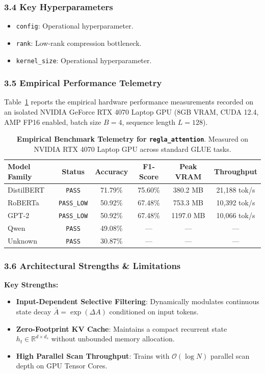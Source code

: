 \subsubsection*{3.4 Key Hyperparameters}
\begin{itemize}
    \item \texttt{config}: Operational hyperparameter.
    \item \texttt{rank}: Low-rank compression bottleneck.
    \item \texttt{kernel\_size}: Operational hyperparameter.
\end{itemize}

\subsubsection*{3.5 Empirical Performance Telemetry}
Table~\ref{tab:telemetry_regla_attention} reports the empirical hardware performance measurements recorded on an isolated NVIDIA GeForce RTX 4070 Laptop GPU (8GB VRAM, CUDA 12.4, AMP FP16 enabled, batch size $B=4$, sequence length $L=128$).

\begin{table}[h]
\centering
\small
\caption{\textbf{Empirical Benchmark Telemetry for \texttt{regla\_attention}}. Measured on NVIDIA RTX 4070 Laptop GPU across standard GLUE tasks.}
\label{tab:telemetry_regla_attention}
\begin{tabular*}{\columnwidth}{@{\extracolsep{\fill}}lccccc}
\toprule
\textbf{Model Family} & \textbf{Status} & \textbf{Accuracy} & \textbf{F1-Score} & \textbf{Peak VRAM} & \textbf{Throughput} \\
\midrule
DistilBERT & \texttt{PASS} & 71.79\% & 75.60\% & 380.2 MB & 21,188 tok/s \\
RoBERTa & \texttt{PASS\_LOW} & 50.92\% & 67.48\% & 753.3 MB & 10,392 tok/s \\
GPT-2 & \texttt{PASS\_LOW} & 50.92\% & 67.48\% & 1197.0 MB & 10,066 tok/s \\
Qwen & \texttt{PASS} & 49.08\% & --- & --- & --- \\
Unknown & \texttt{PASS} & 30.87\% & --- & --- & --- \\
\bottomrule
\end{tabular*}
\end{table}

\subsubsection*{3.6 Architectural Strengths \& Limitations}
\textbf{Key Strengths:}
\begin{itemize}
    \item \textbf{Input-Dependent Selective Filtering}: Dynamically modulates continuous state decay $\bar{A} = \exp(\Delta A)$ conditioned on input tokens.
    \item \textbf{Zero-Footprint KV Cache}: Maintains a compact recurrent state $h_t \in \mathbb{R}^{d \times d_s}$ without unbounded memory allocation.
    \item \textbf{High Parallel Scan Throughput}: Trains with $\mathcal{O}(\log N)$ parallel scan depth on GPU Tensor Cores.
\end{itemize}

